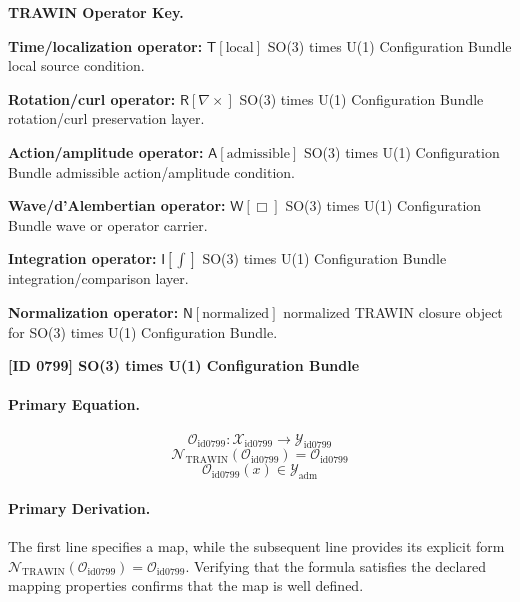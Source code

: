 \par\vspace{0.45\baselineskip}
\noindent\begin{minipage}[t]{\linewidth}
\begingroup
\small
\raggedright
\textbf{TRAWIN Operator Key.}\par
\noindent\textbf{Time/localization operator:} $\mathsf{T}\!\left[\mathrm{local}\right]$ SO(3) times U(1) Configuration Bundle local source condition.\par
\noindent\textbf{Rotation/curl operator:} $\mathsf{R}\!\left[\nabla\times\right]$ SO(3) times U(1) Configuration Bundle rotation/curl preservation layer.\par
\noindent\textbf{Action/amplitude operator:} $\mathsf{A}\!\left[\mathrm{admissible}\right]$ SO(3) times U(1) Configuration Bundle admissible action/amplitude condition.\par
\noindent\textbf{Wave/d'Alembertian operator:} $\mathsf{W}\!\left[\Box\right]$ SO(3) times U(1) Configuration Bundle wave or operator carrier.\par
\noindent\textbf{Integration operator:} $\mathsf{I}\!\left[\int\right]$ SO(3) times U(1) Configuration Bundle integration/comparison layer.\par
\noindent\textbf{Normalization operator:} $\mathsf{N}\!\left[\mathrm{normalized}\right]$ normalized TRAWIN closure object for SO(3) times U(1) Configuration Bundle.\par
\endgroup
\end{minipage}

\clearpage
\noindent\textbf{[ID 0799] SO(3) times U(1) Configuration Bundle}\par
\vspace{0.35em}
\paragraph{Primary Equation.}
\[
\mathcal{O}_{\mathrm{id0799}}:\mathcal{X}_{\mathrm{id0799}}\longrightarrow\mathcal{Y}_{\mathrm{id0799}}
\]
\[
\mathcal{N}_{\mathrm{TRAWIN}}(\mathcal{O}_{\mathrm{id0799}})=\mathcal{O}_{\mathrm{id0799}}
\]
\[
\mathcal{O}_{\mathrm{id0799}}(x)\in\mathcal{Y}_{\mathrm{adm}}
\]

\paragraph{Primary Derivation.}
The first line specifies a map, while the subsequent line provides its explicit form \( \mathcal{N}_{\mathrm{TRAWIN}}(\mathcal{O}_{\mathrm{id0799}})=\mathcal{O}_{\mathrm{id0799}} \). Verifying that the formula satisfies the declared mapping properties confirms that the map is well defined.
